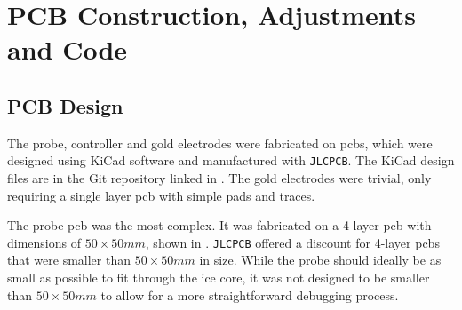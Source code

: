 
\chapter{PCB Construction, Adjustments and Code}

\section{PCB Design}

The probe, controller and gold electrodes were fabricated on \glspl{pcb}, which were designed using KiCad software and manufactured with \texttt{JLCPCB}.
The KiCad design files are in the Git repository linked in . 
The gold electrodes were trivial, only requiring a single layer \gls{pcb} with simple pads and traces.

The probe \gls{pcb} was the most complex.
It was fabricated on a 4-layer \gls{pcb} with dimensions of $50\times 50mm$, shown in .
\texttt{JLCPCB} offered a discount for 4-layer \glspl{pcb} that were smaller than $50\times 50mm$ in size.
While the probe should ideally be as small as possible to fit through the ice core, it was not designed to be smaller than $50\times 50mm$ to allow for a more straightforward debugging process.

